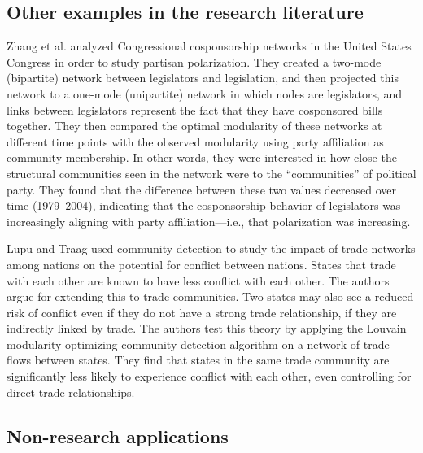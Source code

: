 \hypertarget{other-research}{\subsection{Other examples in the research
literature}\label{other-research}}

Zhang et al. \autocite{zhang_community_2008} analyzed Congressional
cosponsorship networks in the United States Congress in order to study
partisan polarization. They created a two-mode (bipartite) network
between legislators and legislation, and then projected this network to
a one-mode (unipartite) network in which nodes are legislators, and
links between legislators represent the fact that they have cosponsored
bills together. They then compared the optimal modularity of these
networks at different time points with the observed modularity using
party affiliation as community membership. In other words, they were
interested in how close the structural communities seen in the network
were to the ``communities'' of political party. They found that the
difference between these two values decreased over time (1979--2004),
indicating that the cosponsorship behavior of legislators was
increasingly aligning with party affiliation---i.e., that polarization
was increasing.

Lupu and Traag \autocite{lupu_trading_2013} used community detection to
study the impact of trade networks among nations on the potential for
conflict between nations. States that trade with each other are known to
have less conflict with each other. The authors argue for extending this
to trade communities. Two states may also see a reduced risk of conflict
even if they do not have a strong trade relationship, if they are
indirectly linked by trade. The authors test this theory by applying the
Louvain modularity-optimizing community detection algorithm on a network
of trade flows between states. They find that states in the same trade
community are significantly less likely to experience conflict with each
other, even controlling for direct trade relationships.

\subsection{Non-research applications}\label{non-research-applications}

